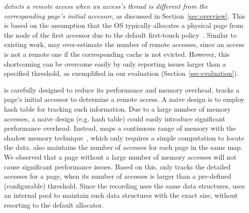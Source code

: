 \textit{\NP{} detects a remote access when an access's thread is different from the corresponding page's initial accessor}, as discussed in Section~\ref{sec:overview}. This is based on the assumption that the OS typically allocates a physical page from the node of the first accessor due to the default first-touch policy~\cite{firsttouch}.  Similar to existing work, \NP{} may over-estimate the number of remote accesses, since an access is not a remote one if the corresponding cache is not evicted. 
However, this shortcoming can be overcome easily by only reporting issues larger than a specified threshold, as exemplified in our evaluation (Section~\ref{sec:evaluation}).  

\NP{} is carefully designed to reduce its performance and memory overhead.  \NP{} tracks a page's initial accessor to determine a remote access. A naive design is to employ hash table for tracking such information.%
Due to a large number of memory accesses, a naive design (e.g. hash table) could easily introduce significant performance overhead. 
Instead, \NP{} maps a continuous range of memory with the shadow memory technique~\cite{qinzhao}, which only requires a simple computation to locate the data. 
\NP{} also maintains the number of accesses for each page in the same map. 
We observed that a page without a large number of memory accesses will not cause significant performance issues. Based on this, \NP{} only tracks the detailed accesses for a page, when its number of accesses is larger than a pre-defined (configurable) threshold. 
Since the recording uses the same data structures, \NP{} uses an internal pool to maintain such data structures with the exact size, without resorting to the default allocator.  

